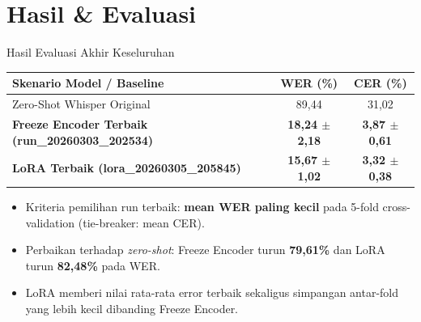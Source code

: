 \section{Hasil \& Evaluasi}

\begin{frame}{Hasil Evaluasi Akhir Keseluruhan}
    \begin{center}
        \small
        \begin{tabular}{lcc}
            \toprule
            \textbf{Skenario Model / Baseline} & \textbf{WER (\%)} & \textbf{CER (\%)} \\
            \midrule
            Zero-Shot Whisper Original & 89,44 & 31,02 \\
            \textbf{Freeze Encoder Terbaik (run\_20260303\_202534)} & \textbf{18,24 $\pm$ 2,18} & \textbf{3,87 $\pm$ 0,61} \\
            \midrule
            \textbf{LoRA Terbaik (lora\_20260305\_205845)} & \textbf{15,67 $\pm$ 1,02} & \textbf{3,32 $\pm$ 0,38} \\
            \bottomrule
        \end{tabular}
    \end{center}
    \vspace{0.2cm}
    \begin{itemize}
        \item Kriteria pemilihan run terbaik: \textbf{mean WER paling kecil} pada 5-fold cross-validation (tie-breaker: mean CER).
        \item Perbaikan terhadap \textit{zero-shot}: Freeze Encoder turun \textbf{79,61\%} dan LoRA turun \textbf{82,48\%} pada WER.
        \item LoRA memberi nilai rata-rata error terbaik sekaligus simpangan antar-fold yang lebih kecil dibanding Freeze Encoder.
    \end{itemize}
\end{frame}

